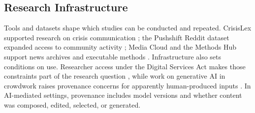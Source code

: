 \subsection{Research Infrastructure}
Tools and datasets shape which studies can be conducted and repeated. CrisisLex supported research on crisis communication \citep{p14538}; the Pushshift Reddit dataset expanded access to community activity \citep{p7347}; Media Cloud and the Methods Hub support news archives and executable methods \citep{p18127,p42804}. Infrastructure also sets conditions on use. Researcher access under the Digital Services Act makes those constraints part of the research question \citep{p42671}, while work on generative AI in crowdwork raises provenance concerns for apparently human-produced inputs \citep{p31452}. In AI-mediated settings, provenance includes model versions and whether content was composed, edited, selected, or generated.
